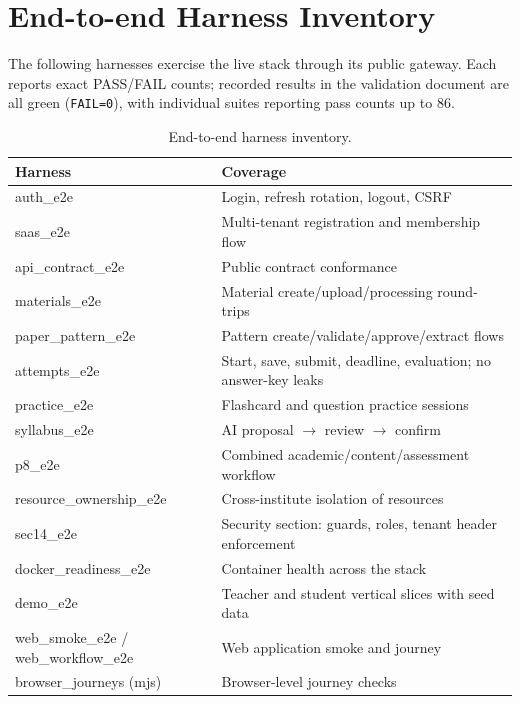 \section{End-to-end Harness Inventory}

The following harnesses exercise the live stack through its public gateway.
Each reports exact PASS/FAIL counts; recorded results in the validation
document are all green (\texttt{FAIL=0}), with individual suites reporting
pass counts up to 86.

\begin{table}[H]
\centering
\caption{End-to-end harness inventory.}
\label{tab:e2e}
\small
\begin{tabular}{@{}p{6.2cm}p{\dimexpr\textwidth-6.2cm-12pt\relax}@{}}
\toprule
\textbf{Harness} & \textbf{Coverage} \\
\midrule
auth\_e2e & Login, refresh rotation, logout, CSRF \\
saas\_e2e & Multi-tenant registration and membership flow \\
api\_contract\_e2e & Public contract conformance \\
materials\_e2e & Material create/upload/processing round-trips \\
paper\_pattern\_e2e & Pattern create/validate/approve/extract flows \\
attempts\_e2e & Start, save, submit, deadline, evaluation; no answer-key leaks \\
practice\_e2e & Flashcard and question practice sessions \\
syllabus\_e2e & AI proposal $\rightarrow$ review $\rightarrow$ confirm \\
p8\_e2e & Combined academic/content/assessment workflow \\
resource\_ownership\_e2e & Cross-institute isolation of resources \\
sec14\_e2e & Security section: guards, roles, tenant header enforcement \\
docker\_readiness\_e2e & Container health across the stack \\
demo\_e2e & Teacher and student vertical slices with seed data \\
web\_smoke\_e2e / web\_workflow\_e2e & Web application smoke and journey \\
browser\_journeys (mjs) & Browser-level journey checks \\
\bottomrule
\end{tabular}
\end{table}
